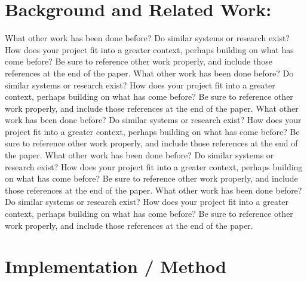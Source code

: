 \documentclass{acm_proc_article-sp}
\begin{document}
\section{{\secit Background and Related Work:}}
What other work has been done before? Do similar systems or research exist? How does your project fit into a greater context, perhaps building on what has come before? Be sure to reference other work properly, and include those references at the end of the paper. What other work has been done before? Do similar systems or research exist? How does your project fit into a greater context, perhaps building on what has come before? Be sure to reference other work properly, and include those references at the end of the paper. What other work has been done before? Do similar systems or research exist? How does your project fit into a greater context, perhaps building on what has come before? Be sure to reference other work properly, and include those references at the end of the paper. What other work has been done before? Do similar systems or research exist? How does your project fit into a greater context, perhaps building on what has come before? Be sure to reference other work properly, and include those references at the end of the paper. What other work has been done before? Do similar systems or research exist? How does your project fit into a greater context, perhaps building on what has come before? Be sure to reference other work properly, and include those references at the end of the paper.


\section{Implementation / Method}
\end{document}
